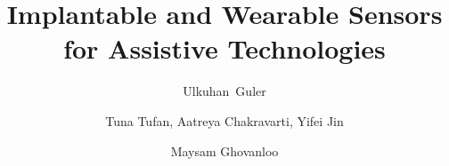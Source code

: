 \documentclass[review]{elsarticle}
\begin{document}
\begin{frontmatter}
\title{Implantable and Wearable Sensors for Assistive Technologies}


\author{Ulkuhan~Guler}
\address{Worcester Polytechnic Institute, Electrical and Computer Engineering Department, 100 Institute Road, Worcester, MA, USA\\
Email: uguler@wpi.edu}

\author{Tuna Tufan, Aatreya Chakravarti, Yifei Jin}
\address{Worcester Polytechnic Institute, Electrical and Computer Engineering Department, 100 Institute Road, Worcester, MA, USA\\
Email: ttufan@wpi.edu, achakravarti@wpi.edu, yjin3@wpi.edu}

\author{Maysam Ghovanloo}
\address{Bionic Sciences, Atlanta, GA, USA\\
Email: mghovan@ieee.org}
%
% 
%



% 


\end{frontmatter}
\end{document}
